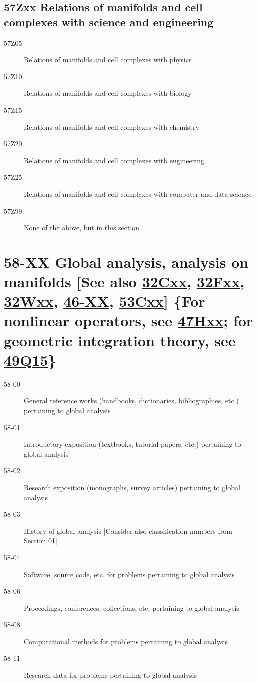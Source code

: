 \documentclass[letterpaper]{article}
\begin{document}
\subsection*{57Zxx Relations of manifolds and cell complexes with science and engineering }\label{57Zxx}
\begin{description} 
\item [57Z05]\label{57Z05} Relations of manifolds and cell complexes with physics
\item [57Z10]\label{57Z10} Relations of manifolds and cell complexes with biology
\item [57Z15]\label{57Z15} Relations of manifolds and cell complexes with chemistry
\item [57Z20]\label{57Z20} Relations of manifolds and cell complexes with engineering
\item [57Z25]\label{57Z25} Relations of manifolds and cell complexes with computer and data science
\item [57Z99]\label{57Z99} None of the above, but in this section 
\end{description}
\section*{58-XX Global analysis, analysis on manifolds [See also \hyperref[32Cxx]{32Cxx}, \hyperref[32Fxx]{32Fxx}, \hyperref[32Wxx]{32Wxx}, \hyperref[46-XX]{46-XX}, \hyperref[53Cxx]{53Cxx}] \{For nonlinear operators, see \hyperref[47Hxx]{47Hxx}; for geometric integration theory, see \hyperref[49Q15]{49Q15}\} }\label{58-XX}
\begin{description}
\item [58-00]\label{58-00} General reference works (handbooks, dictionaries, bibliographies, etc.) pertaining to global analysis
\item [58-01]\label{58-01} Introductory exposition (textbooks, tutorial papers, etc.) pertaining to global analysis
\item [58-02]\label{58-02} Research exposition (monographs, survey articles) pertaining to global analysis
\item [58-03]\label{58-03} History of global analysis [Consider also classification numbers from Section \hyperref[01-XX]{01}]
\item [58-04]\label{58-04} Software, source code, etc. for problems pertaining to global analysis
\item [58-06]\label{58-06} Proceedings, conferences, collections, etc. pertaining to global analysis
\item [58-08]\label{58-08} Computational methods for problems pertaining to global analysis
\item [58-11]\label{58-11} Research data for problems pertaining to global analysis
\end{description}
\end{document}
